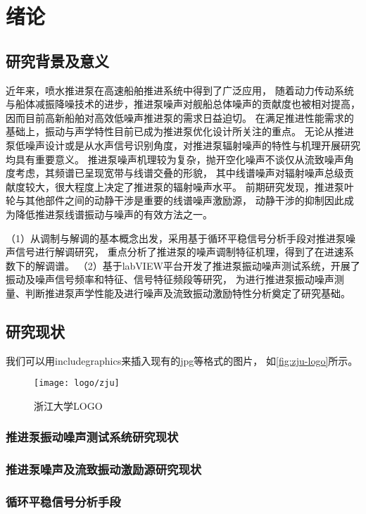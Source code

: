 \chapter{绪论}
\section{研究背景及意义}

近年来，喷水推进泵在高速船舶推进系统中得到了广泛应用，
随着动力传动系统与船体减振降噪技术的进步，推进泵噪声对舰船总体噪声的贡献度也被相对提高，
因而目前高新船舶对高效低噪声推进泵的需求日益迫切。
在满足推进性能需求的基础上，振动与声学特性目前已成为推进泵优化设计所关注的重点。
无论从推进泵低噪声设计或是从水声信号识别角度，对推进泵辐射噪声的特性与机理开展研究均具有重要意义。
推进泵噪声机理较为复杂，抛开空化噪声不谈仅从流致噪声角度考虑，其频谱已呈现宽带与线谱交叠的形貌，
其中线谱噪声对辐射噪声总级贡献度较大，很大程度上决定了推进泵的辐射噪声水平。
前期研究发现，推进泵叶轮与其他部件之间的动静干涉是重要的线谱噪声激励源，
动静干涉的抑制因此成为降低推进泵线谱振动与噪声的有效方法之一。

（1）从调制与解调的基本概念出发，采用基于循环平稳信号分析手段对推进泵噪声信号进行解调研究，
重点分析了推进泵的噪声调制特征机理，得到了在进速系数下的解调谱。
（2）基于labVIEW平台开发了推进泵振动噪声测试系统，开展了振动及噪声信号频率和特征、信号特征频段等研究，
为进行推进泵振动噪声测量、判断推进泵声学性能及进行噪声及流致振动激励特性分析奠定了研究基础。 


\section{研究现状}

我们可以用includegraphics来插入现有的jpg等格式的图片，
如\autoref{fig:zju-logo}所示。

\begin{figure}[htbp]
    \centering
    \texttt{[image: logo/zju]}
    \caption{\label{fig:zju-logo}浙江大学LOGO}
\end{figure}


\subsection{推进泵振动噪声测试系统研究现状}
\subsection{推进泵噪声及流致振动激励源研究现状}
\subsection{循环平稳信号分析手段}



